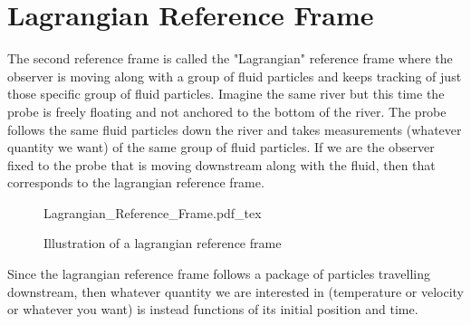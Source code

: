 \section{Lagrangian Reference Frame}
\begin{comment}
\end{comment}
The second reference frame is called the "Lagrangian" reference frame where the observer is moving along with a group of fluid particles and keeps tracking of just those specific group of fluid particles.
Imagine the same river but this time the probe is freely floating and not anchored to the bottom of the river.
The probe follows the same fluid particles down the river and takes measurements (whatever quantity we want) of the same group of fluid particles.
If we are the observer fixed to the probe that is moving downstream along with the fluid, then that corresponds to the lagrangian reference frame.
\begin{figure}[H]\centering
\def\svgwidth{500px}
{Lagrangian_Reference_Frame.pdf_tex}
\caption{Illustration of a lagrangian reference frame}
\label{lagrangian reference frame fluid}
\end{figure}
Since the lagrangian reference frame follows a package of particles travelling downstream, then whatever quantity we are interested in (temperature or velocity or whatever you want) is instead functions of its initial position and time. 

